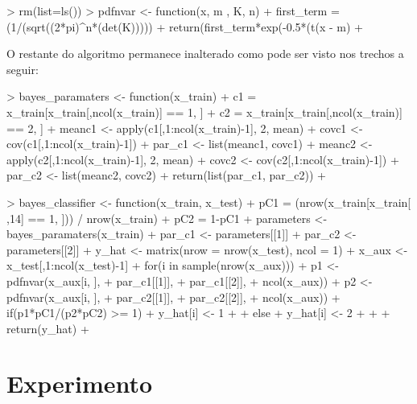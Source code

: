 \documentclass[12pt]{article}
\begin{document}
\begin{Schunk}
\begin{Sinput}
> rm(list=ls())
> pdfnvar <- function(x, m , K, n){
+   first_term = (1/(sqrt((2*pi)^n*(det(K)))))
+   return(first_term*exp(-0.5*(t(x - m)%*% (solve(K)) %*% (x - m))))
+ }
\end{Sinput}
\end{Schunk}

  \par O restante do algoritmo permanece inalterado como pode ser visto nos trechos a seguir:

\begin{Schunk}
\begin{Sinput}
> bayes_paramaters <- function(x_train){
+   c1 = x_train[x_train[,ncol(x_train)] == 1, ]
+   c2 = x_train[x_train[,ncol(x_train)] == 2, ]
+   meanc1 <- apply(c1[,1:ncol(x_train)-1], 2, mean)
+   covc1 <- cov(c1[,1:ncol(x_train)-1])
+   par_c1 <- list(meanc1, covc1)
+   meanc2 <- apply(c2[,1:ncol(x_train)-1], 2, mean)
+   covc2 <- cov(c2[,1:ncol(x_train)-1])
+   par_c2 <- list(meanc2, covc2)
+   return(list(par_c1, par_c2))
+ }
\end{Sinput}
\end{Schunk}


  \par 
\begin{Schunk}
\begin{Sinput}
> bayes_classifier <- function(x_train, x_test){
+   pC1 = (nrow(x_train[x_train[ ,14] == 1, ])) / nrow(x_train)
+   pC2 = 1-pC1
+   parameters <- bayes_paramaters(x_train)
+   par_c1 <- parameters[[1]]
+   par_c2 <- parameters[[2]]
+   y_hat <- matrix(nrow = nrow(x_test), ncol = 1)
+   x_aux <- x_test[,1:ncol(x_test)-1]
+   for(i in sample(nrow(x_aux))){
+     p1 <- pdfnvar(x_aux[i, ],
+                   par_c1[[1]],
+                   par_c1[[2]],
+                   ncol(x_aux))
+     p2 <- pdfnvar(x_aux[i, ],
+                     par_c2[[1]],
+                     par_c2[[2]],
+                     ncol(x_aux))
+     if(p1*pC1/(p2*pC2) >= 1){
+       y_hat[i] <- 1
+     }
+     else{
+       y_hat[i] <- 2
+     }
+   }
+   return(y_hat)
+ }
\end{Sinput}
\end{Schunk}



\section{Experimento}
\end{document}
